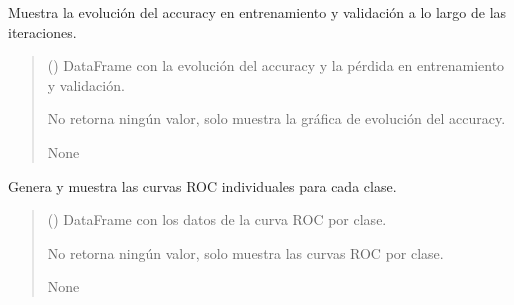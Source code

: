 \documentclass[letterpaper,10pt,spanish]{sphinxmanual}
\begin{document}

\begin{fulllineitems}
\label{\detokenize{Funciones_Visualizacion:leer_metricas.plot_accuracy_evolution}}
\pysigstartsignatures
\pysiglinewithargsret
{}
{}
{}
\pysigstopsignatures
\sphinxAtStartPar
Muestra la evolución del accuracy en entrenamiento y validación a lo largo de las iteraciones.
\begin{quote}\begin{description}
\sphinxAtStartPar
{} () \textendash{} DataFrame con la evolución del accuracy y la pérdida 
en entrenamiento y validación.

\sphinxAtStartPar
No retorna ningún valor, solo muestra la gráfica de evolución del accuracy.

\sphinxAtStartPar
None

\end{description}\end{quote}

\end{fulllineitems}


\begin{fulllineitems}
\label{\detokenize{Funciones_Visualizacion:leer_metricas.plot_classes_roc_curves}}
\pysigstartsignatures
\pysiglinewithargsret
{}
{}
{}
\pysigstopsignatures
\sphinxAtStartPar
Genera y muestra las curvas ROC individuales para cada clase.
\begin{quote}\begin{description}
\sphinxAtStartPar
{} () \textendash{} DataFrame con los datos de la curva ROC por clase.

\sphinxAtStartPar
No retorna ningún valor, solo muestra las curvas ROC por clase.

\sphinxAtStartPar
None

\end{description}\end{quote}

\end{fulllineitems}
\end{document}
